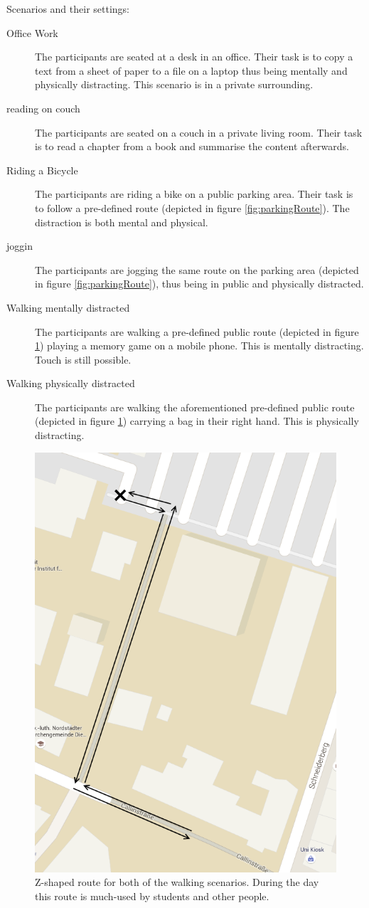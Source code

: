 Scenarios and their settings:
\begin{description}
	\item[Office Work]{The participants are seated at a desk in an office. Their task is to copy a text from a sheet of paper to a file on a laptop thus being mentally and physically distracting. This scenario is in a private surrounding.}
	\item[reading on couch]{The participants are seated on a couch in a private living room. Their task is to read a chapter from a book and summarise the content afterwards.}
	\item[Riding a Bicycle]{The participants are riding a bike on a public parking area. Their task is to follow a pre-defined route (depicted in figure \ref{fig:parkingRoute}). The distraction is both mental and physical.}
	\item[joggin]{The participants are jogging the same route on the parking area (depicted in figure \ref{fig:parkingRoute}), thus being in public and physically distracted.}
	\item[Walking mentally distracted]{The participants are walking a pre-defined public route (depicted in figure \ref{fig:walkingRoute}) playing a memory game on a mobile phone. This is mentally distracting. Touch is still possible.}
	\item[Walking physically distracted]{The participants are walking the aforementioned pre-defined public route (depicted in figure \ref{fig:walkingRoute}) carrying a bag in their right hand. This is physically distracting.}
\end{description}

\begin{figure}[bth]
	\myfloatalign
	\label{fig:walkingRoute}
	\includegraphics[width=.7\linewidth]{img/walkingRoute.png}
	\caption{Z-shaped route for both of the walking scenarios. During the day this route is much-used by students and other people.}
\end{figure}

